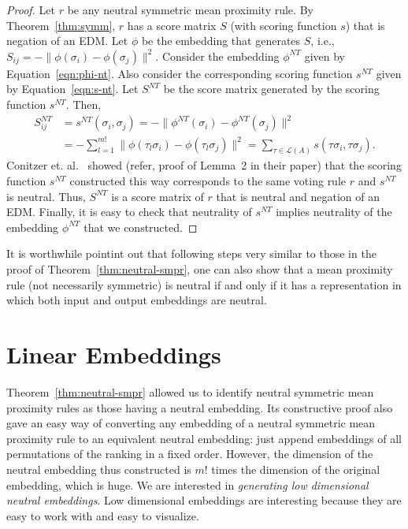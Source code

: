 \documentclass[10pt,letterpaper]{article}
\newcommand{\calL}{{\mathcal{L}}}
\newcommand{\rank}{{\calL(A)}}
\newcommand{\nt}{NT}
\begin{document}
\begin{proof}
Let $r$ be any neutral symmetric mean proximity rule. By Theorem~\ref{thm:symm}, $r$ has a score matrix $S$ (with scoring function $s$) that is negation of an EDM. Let $\phi$ be the embedding that generates $S$, i.e., $S_{ij} = -\|\phi(\sigma_i)-\phi(\sigma_j)\|^2$. Consider the embedding $\phi^{\nt}$ given by Equation~\eqref{eqn:phi-nt}. Also consider the corresponding scoring function $s^{\nt}$ given by Equation~\eqref{eqn:s-nt}. Let $S^{\nt}$ be the score matrix generated by the scoring function $s^{\nt}$. Then, 
\begin{align*}
S^{\nt}_{ij} &= s^{\nt}(\sigma_i,\sigma_j) = -\|\phi^{\nt}(\sigma_i)-\phi^{\nt}(\sigma_j)\|^2 \\
&= - \sum_{l=1}^{m!} \|\phi(\tau_l \sigma_i)-\phi(\tau_l \sigma_j)\|^2 = \sum_{\tau \in \rank} s(\tau \sigma_i, \tau \sigma_j).
\end{align*}
Conitzer et. al.~\cite{CRX09} showed (refer, proof of Lemma~2 in their paper) that the scoring function $s^{\nt}$ constructed this way corresponds to the same voting rule $r$ and $s^{\nt}$ is neutral. Thus, $S^{\nt}$ is a score matrix of $r$ that is neutral and negation of an EDM. Finally, it is easy to check that neutrality of $s^{\nt}$ implies neutrality of the embedding $\phi^{\nt}$ that we constructed.
\end{proof}

It is worthwhile pointint out that following steps very similar to those in the proof of Theorem~\ref{thm:neutral-smpr}, one can also show that a mean proximity rule (not necessarily symmetric) is neutral if and only if it has a representation in which both input and output embeddings are neutral. 


\section{Linear Embeddings}

Theorem~\ref{thm:neutral-smpr} allowed us to identify neutral symmetric mean proximity rules as those having a neutral embedding. %
Its constructive proof also gave an easy way of converting any embedding of a neutral symmetric mean proximity rule to an equivalent neutral embedding: just append embeddings of all permutations of the ranking in a fixed order. However, the dimension of the neutral embedding thus constructed is $m!$ times the dimension of the original embedding, which is huge. We are interested in \emph{generating low dimensional neutral embeddings}. Low dimensional embeddings are interesting because they are easy to work with and easy to visualize. 
\end{document}
